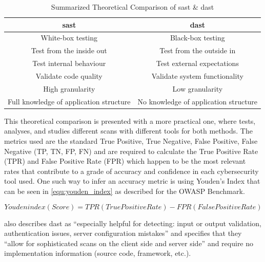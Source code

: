 \begin{table}[ht]
\centering

\begin{tabular}{cc}
\textbf{\acrshort{sast}} & \textbf{\acrshort{dast}}\\
\hline
White-box testing  & Black-box testing \\
Test from the inside out  & Test from the outside in \\
Test internal behaviour  & Test external expectations \\
Validate code quality  & Validate system functionality \\
High granularity  & Low granularity \\
Full knowledge of application structure & No knowledge of application structure \\

\end{tabular}
\caption{Summarized Theoretical Comparison of \acrshort{sast} \& \acrshort{dast}}
\label{tab:sast_vs_dast}
\end{table}

This theoretical comparison is presented with a more practical one, where \citet{SASTvsDAST} tests, analyses, and studies different scans with different tools for both methods. The metrics used are the standard True Positive, True Negative, False Positive, False Negative (TP, TN, FP, FN) and are required to calculate the True Positive Rate (TPR) and False Positive Rate (FPR) which happen to be the most relevant rates that contribute to a grade of accuracy and confidence in each cybersecurity tool used. One such way to infer an accuracy metric is using Youden's Index that can be seen in \cref{equ:youden_index} as \citeauthor{owasp_youden_index} described for the OWASP Benchmark.

\begin{mycapequ}[htbp]
    \centering
    \caption{Youden's Index or Youden's J statistic}
    \begin{equation}
        Youden index (Score) = TPR (True Positive Rate) - FPR (False Positive Rate)
    \label{equ:youden_index}
    \end{equation}
\end{mycapequ}


\citeauthor{owasp-devsecops-dast} also describes \acrshort{dast} as ``especially helpful for detecting: input or output validation, authentication issues, server configuration mistakes'' and specifies that they ``allow for sophisticated scans on the client side and server side'' and require no implementation information (source code, framework, etc.). 

